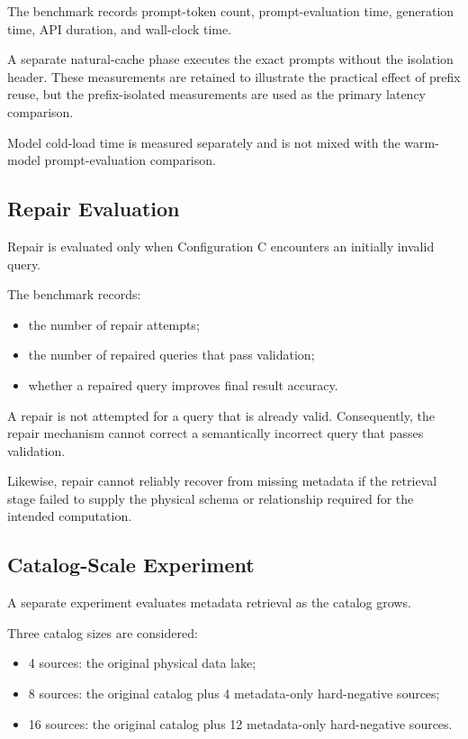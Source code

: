 The benchmark records prompt-token count, prompt-evaluation time, generation
time, API duration, and wall-clock time.

A separate natural-cache phase executes the exact prompts without the
isolation header. These measurements are retained to illustrate the practical
effect of prefix reuse, but the prefix-isolated measurements are used as the
primary latency comparison.

Model cold-load time is measured separately and is not mixed with the
warm-model prompt-evaluation comparison.


\subsection{Repair Evaluation}

Repair is evaluated only when Configuration C encounters an initially invalid
query.

The benchmark records:

\begin{itemize}

    \item the number of repair attempts;

    \item the number of repaired queries that pass validation;

    \item whether a repaired query improves final result accuracy.

\end{itemize}

A repair is not attempted for a query that is already valid. Consequently,
the repair mechanism cannot correct a semantically incorrect query that passes
validation.

Likewise, repair cannot reliably recover from missing metadata if the
retrieval stage failed to supply the physical schema or relationship required
for the intended computation.


\subsection{Catalog-Scale Experiment}

A separate experiment evaluates metadata retrieval as the catalog grows.

Three catalog sizes are considered:

\begin{itemize}

    \item 4 sources: the original physical data lake;

    \item 8 sources: the original catalog plus 4 metadata-only hard-negative
    sources;

    \item 16 sources: the original catalog plus 12 metadata-only
    hard-negative sources.

\end{itemize}

